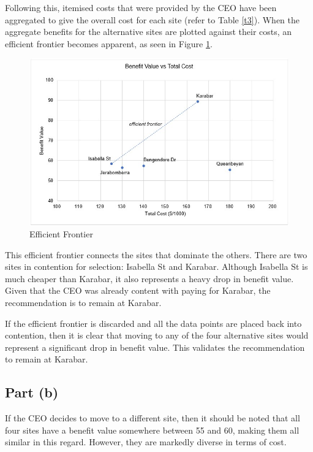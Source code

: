 \documentclass[11pt, a4paper]{article}
\begin{document}
    Following this, itemised costs that were provided by the CEO have been aggregated to give the overall cost for each site (refer to Table \ref{t3}). When the aggregate benefits for the alternative sites are plotted against their costs, an efficient frontier becomes apparent, as seen in Figure \ref{f2}.

    \begin{figure}[hbt!]
        \centering
        \includegraphics[width=\textwidth]{figures/2.jpg}
        \caption{Efficient Frontier}
        \label{f2}
    \end{figure}

    This efficient frontier connects the sites that dominate the others. There are two sites in contention for selection: Isabella St and Karabar. Although Isabella St is much cheaper than Karabar, it also represents a heavy drop in benefit value. Given that the CEO was already content with paying for Karabar, the recommendation is to remain at Karabar.

    If the efficient frontier is discarded and all the data points are placed back into contention, then it is clear that moving to any of the four alternative sites would represent a significant drop in benefit value. This validates the recommendation to remain at Karabar.

    \subsection*{Part (b)}

    If the CEO decides to move to a different site, then it should be noted that all four sites have a benefit value somewhere between 55 and 60, making them all similar in this regard. However, they are markedly diverse in terms of cost.
\end{document}
